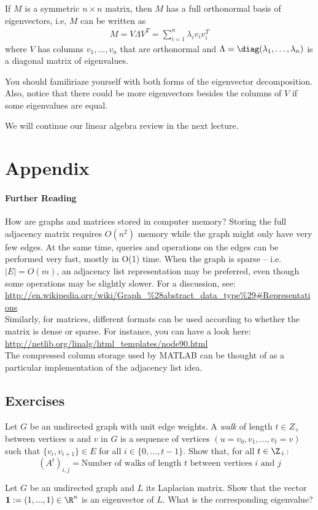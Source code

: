 \begin{theorem}
If $M$ is a symmetric $n\times n$ matrix, then $M$ has a full orthonormal basis of eigenvectors, i.e, $M$ can be written as
\begin{align}
M = V \Lambda V^T = \sum_{i=1}^{n} \lambda_i v_i v_i^T
\end{align}
where $V$ has columns $v_1, \ldots, v_n$ that are orthonormal and $\Lambda=\diag(\lambda_1, \ldots, \lambda_n)$ is a diagonal matrix of eigenvalues.
\end{theorem}
You should familiriaze yourself with both forms of the eigenvector decomposition. Also, notice that there could be more eigenvectors besides the columns of $V$ if some eigenvalues are equal.

We will continue our linear algebra review in the next lecture.

\section{Appendix}

\paragraph{Further Reading} How are graphs and matrices stored in computer memory?
Storing the full adjacency matrix requires $O(n^2)$ memory while the graph might only have very few edges. At the same time, queries and operations on the edges can be performed very fast, mostly in O(1) time. When the graph is sparse -- i.e. $|E| = O(m)$, an adjacency list representation may be preferred, even though some operations may be slightly slower.  For a discussion, see:\\ \url{http://en.wikipedia.org/wiki/Graph_\%28abstract_data_type\%29#Representations} \\
Similarly, for matrices, different formats can be used according to whether the matrix is dense or sparse. For instance, you can have a look here:\\
\url{http://netlib.org/linalg/html_templates/node90.html}\\
The compressed column storage used by MATLAB can be thought of as a particular implementation of the adjacency list idea.

\subsection{Exercises}

\begin{exercise}
Let $G$ be an undirected graph with unit edge weights.  A \emph{walk} of length $t \in Z_+$ between vertices $u$ and $v$ in $G$ is a sequence of vertices $(u=v_0, v_1, \ldots, v_t=v)$ such that $\{v_i, v_{i+1}\} \in E$ for all $i \in \{0,\ldots, t-1\}.$ 
Show that, for all $t \in \Z_+$: 
$$
(A^t)_{i,j} = \textrm{Number of walks of length $t$ between vertices $i$ and $j$}
$$
\end{exercise}
\begin{exercise}
Let $G$ be an undirected graph and $L$ its Laplacian matrix. Show that the vector $\mathbf{1}:= (1, ... , 1) \in \R^n$ is an eigenvector of $L$. What is the corresponding eigenvalue?
\end{exercise}

